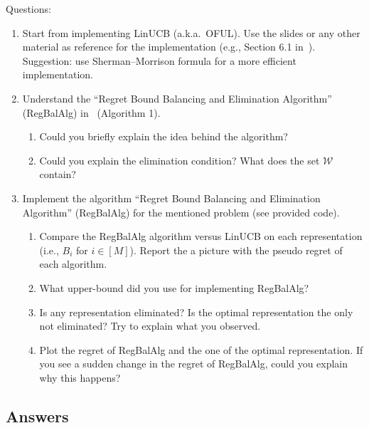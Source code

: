 \documentclass[a4paper]{article}
\begin{document}
Questions:
\begin{enumerate}
   \item Start from implementing LinUCB (a.k.a.\ OFUL). Use the slides or any other material as reference for the implementation (e.g., Section 6.1 in~\citep{pacchiano2020regret}). Suggestion: use Sherman–Morrison formula for a more efficient implementation.
   \item Understand the ``Regret Bound Balancing and Elimination Algorithm'' (RegBalAlg) in~\citep{pacchiano2020regret} (Algorithm 1).


         \begin{enumerate}
            \item Could you briefly explain the idea behind the algorithm?
            \item Could you explain the elimination condition? What does the set $\mathcal{W}$ contain?
         \end{enumerate}
   \item Implement the algorithm ``Regret Bound Balancing and Elimination Algorithm'' (RegBalAlg) for the mentioned problem (see provided code).
         \begin{enumerate}
            \item Compare the RegBalAlg algorithm versus LinUCB on each representation (i.e., $B_i$ for $i \in [M]$). Report the a picture with the pseudo regret of each algorithm.
            \item What upper-bound did you use for implementing RegBalAlg?
            \item Is any representation eliminated? Is the optimal representation the only not eliminated? Try to explain what you observed.
            \item Plot the regret of RegBalAlg and the one of the optimal representation. If you see a sudden change in the regret of RegBalAlg, could you explain why this happens?
         \end{enumerate}
\end{enumerate}

\subsection*{Answers}
\end{document}
